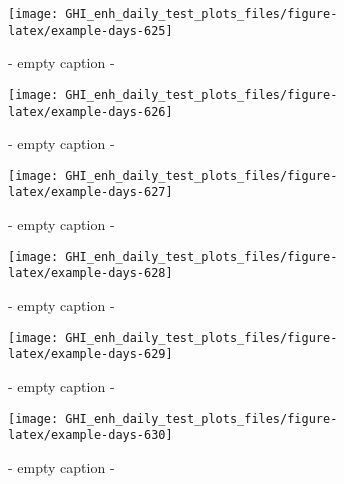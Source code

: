 \documentclass[
  10pt,
  a4paper,oneside]{article}
\begin{document}
\begin{figure}[H]

{\centering \texttt{[image: GHI\_enh\_daily\_test\_plots\_files/figure-latex/example-days-625]} 

}

\caption{ - empty caption - }\label{fig:example-days-625}
\end{figure}

\begin{figure}[H]

{\centering \texttt{[image: GHI\_enh\_daily\_test\_plots\_files/figure-latex/example-days-626]} 

}

\caption{ - empty caption - }\label{fig:example-days-626}
\end{figure}

\begin{figure}[H]

{\centering \texttt{[image: GHI\_enh\_daily\_test\_plots\_files/figure-latex/example-days-627]} 

}

\caption{ - empty caption - }\label{fig:example-days-627}
\end{figure}

\begin{figure}[H]

{\centering \texttt{[image: GHI\_enh\_daily\_test\_plots\_files/figure-latex/example-days-628]} 

}

\caption{ - empty caption - }\label{fig:example-days-628}
\end{figure}

\begin{figure}[H]

{\centering \texttt{[image: GHI\_enh\_daily\_test\_plots\_files/figure-latex/example-days-629]} 

}

\caption{ - empty caption - }\label{fig:example-days-629}
\end{figure}

\begin{figure}[H]

{\centering \texttt{[image: GHI\_enh\_daily\_test\_plots\_files/figure-latex/example-days-630]} 

}

\caption{ - empty caption - }\label{fig:example-days-630}
\end{figure}
\end{document}
